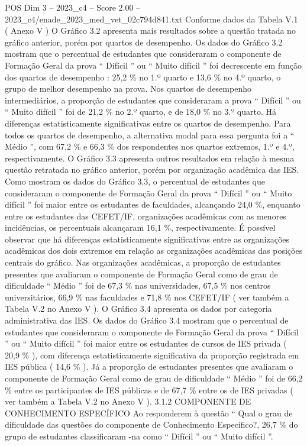 \begin{textsample}{POS Dim 3 – 2023\_c4 – Score 2.00 – 2023\_c4/enade\_2023\_med\_vet\_02c794d841.txt}
Conforme dados da Tabela V.1 ( Anexo V ) O Gráfico 3.2 apresenta mais resultados sobre a questão tratada no gráfico anterior, porém por quartos de desempenho.
Os dados do Gráfico 3.2 mostram que o percentual de estudantes que consideraram o componente de Formação Geral da prova “ Difícil ” ou “ Muito difícil ” foi decrescente em função dos quartos de desempenho : 25,2 \% no 1.º quarto e 13,6 \% no 4.º quarto, o grupo de melhor desempenho na prova.
Nos quartos de desempenho intermediários, a proporção de estudantes que consideraram a prova “ Difícil ” ou “ Muito difícil ” foi de 21,2 \% no 2.º quarto, e de 18,0 \% no 3.º quarto.
Há diferenças estatisticamente significativas entre os quartos de desempenho.
Para todos os quartos de desempenho, a alternativa modal para essa pergunta foi a “ Médio ”, com 67,2 \% e 66,3 \% dos respondentes nos quartos extremos, 1.º e 4.º, respectivamente.
O Gráfico 3.3 apresenta outros resultados em relação à mesma questão retratada no gráfico anterior, porém por organização acadêmica das IES.
Como mostram os dados do Gráfico 3.3, o percentual de estudantes que consideraram o componente de Formação Geral da prova “ Difícil ” ou “ Muito difícil ” foi maior entre os estudantes de faculdades, alcançando 24,0 \%, enquanto entre os estudantes das CEFET/IF, organizações acadêmicas com as menores incidências, os percentuais alcançaram 16,1 \%, respectivamente.
É possível observar que há diferenças estatisticamente significativas entre as organizações acadêmicas dos dois extremos em relação as organizações acadêmicas das posições centrais do gráfico.
Nas organizações acadêmicas, a proporção de estudantes presentes que avaliaram o componente de Formação Geral como de grau de dificuldade “ Médio ” foi de 67,3 \% nas universidades, 67,5 \% nos centros universitários, 66,9 \% nas faculdades e 71,8 \% nos CEFET/IF ( ver também a Tabela V.2 no Anexo V ).
O Gráfico 3.4 apresenta os dados por categoria administrativa das IES.
Os dados do Gráfico 3.4 mostram que o percentual de estudantes que consideraram o componente de Formação Geral da prova “ Difícil ” ou “ Muito difícil ” foi maior entre os estudantes de cursos de IES privada ( 20,9 \% ), com diferença estatisticamente significativa da proporção registrada em IES pública ( 14,6 \% ).
Já a proporção de estudantes presentes que avaliaram o componente de Formação Geral como de grau de dificuldade “ Médio ” foi de 66,2 \% entre os participantes de IES públicas e de 67,7 \% entre os de IES privadas ( ver também a Tabela V.2 no Anexo V ). 3.1.2 COMPONENTE DE CONHECIMENTO ESPECÍFICO Ao responderem à questão “ Qual o grau de dificuldade das questões do componente de Conhecimento Específico?, 26,7 \% do grupo de estudantes classificaram -na como “ Difícil ” ou “ Muito difícil ”.

\end{textsample}
